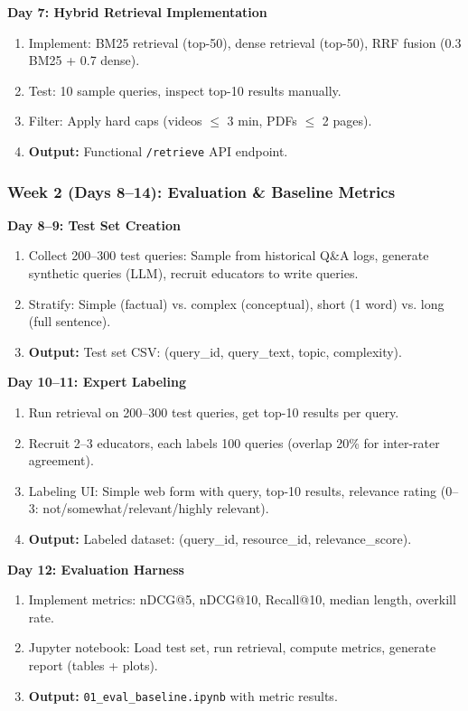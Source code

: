 \documentclass[11pt,letterpaper]{article}
\begin{document}
\textbf{Day 7: Hybrid Retrieval Implementation}
\begin{enumerate}
\item Implement: BM25 retrieval (top-50), dense retrieval (top-50), RRF fusion (0.3 BM25 + 0.7 dense).
\item Test: 10 sample queries, inspect top-10 results manually.
\item Filter: Apply hard caps (videos $\leq$ 3 min, PDFs $\leq$ 2 pages).
\item \textbf{Output:} Functional \texttt{/retrieve} API endpoint.
\end{enumerate}

\subsubsection{Week 2 (Days 8--14): Evaluation \& Baseline Metrics}

\textbf{Day 8--9: Test Set Creation}
\begin{enumerate}
\item Collect 200--300 test queries: Sample from historical Q\&A logs, generate synthetic queries (LLM), recruit educators to write queries.
\item Stratify: Simple (factual) vs. complex (conceptual), short (1 word) vs. long (full sentence).
\item \textbf{Output:} Test set CSV: (query\_id, query\_text, topic, complexity).
\end{enumerate}

\textbf{Day 10--11: Expert Labeling}
\begin{enumerate}
\item Run retrieval on 200--300 test queries, get top-10 results per query.
\item Recruit 2--3 educators, each labels 100 queries (overlap 20\% for inter-rater agreement).
\item Labeling UI: Simple web form with query, top-10 results, relevance rating (0--3: not/somewhat/relevant/highly relevant).
\item \textbf{Output:} Labeled dataset: (query\_id, resource\_id, relevance\_score).
\end{enumerate}

\textbf{Day 12: Evaluation Harness}
\begin{enumerate}
\item Implement metrics: nDCG@5, nDCG@10, Recall@10, median length, overkill rate.
\item Jupyter notebook: Load test set, run retrieval, compute metrics, generate report (tables + plots).
\item \textbf{Output:} \texttt{01\_eval\_baseline.ipynb} with metric results.
\end{enumerate}
\end{document}
